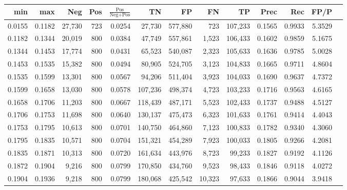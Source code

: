 \begin{tabular}{rrrrrrrrrrrrr}
\toprule
   min &    max &    Neg &   Pos & $\frac{\text{Pos}}{\text{Neg}+\text{Pos}}$ &      TN &      FP &      FN &      TP &   Prec &    Rec &   FP/P \\
\midrule
0.0155 & 0.1182 & 27,730 &   723 &                                     0.0254 &  27,730 & 577,880 &     723 & 107,233 & 0.1565 & 0.9933 & 5.3529 \\
0.1182 & 0.1344 & 20,019 &   800 &                                     0.0384 &  47,749 & 557,861 &   1,523 & 106,433 & 0.1602 & 0.9859 & 5.1675 \\
0.1344 & 0.1453 & 17,774 &   800 &                                     0.0431 &  65,523 & 540,087 &   2,323 & 105,633 & 0.1636 & 0.9785 & 5.0028 \\
0.1453 & 0.1535 & 15,382 &   800 &                                     0.0494 &  80,905 & 524,705 &   3,123 & 104,833 & 0.1665 & 0.9711 & 4.8604 \\
0.1535 & 0.1599 & 13,301 &   800 &                                     0.0567 &  94,206 & 511,404 &   3,923 & 104,033 & 0.1690 & 0.9637 & 4.7372 \\
0.1599 & 0.1658 & 13,030 &   800 &                                     0.0578 & 107,236 & 498,374 &   4,723 & 103,233 & 0.1716 & 0.9563 & 4.6165 \\
0.1658 & 0.1706 & 11,203 &   800 &                                     0.0667 & 118,439 & 487,171 &   5,523 & 102,433 & 0.1737 & 0.9488 & 4.5127 \\
0.1706 & 0.1753 & 11,698 &   800 &                                     0.0640 & 130,137 & 475,473 &   6,323 & 101,633 & 0.1761 & 0.9414 & 4.4043 \\
0.1753 & 0.1795 & 10,613 &   800 &                                     0.0701 & 140,750 & 464,860 &   7,123 & 100,833 & 0.1782 & 0.9340 & 4.3060 \\
0.1795 & 0.1835 & 10,571 &   800 &                                     0.0704 & 151,321 & 454,289 &   7,923 & 100,033 & 0.1805 & 0.9266 & 4.2081 \\
0.1835 & 0.1871 & 10,313 &   800 &                                     0.0720 & 161,634 & 443,976 &   8,723 &  99,233 & 0.1827 & 0.9192 & 4.1126 \\
0.1872 & 0.1904 &  9,216 &   800 &                                     0.0799 & 170,850 & 434,760 &   9,523 &  98,433 & 0.1846 & 0.9118 & 4.0272 \\
0.1904 & 0.1936 &  9,218 &   800 &                                     0.0799 & 180,068 & 425,542 &  10,323 &  97,633 & 0.1866 & 0.9044 & 3.9418 \\

\end{tabular}
